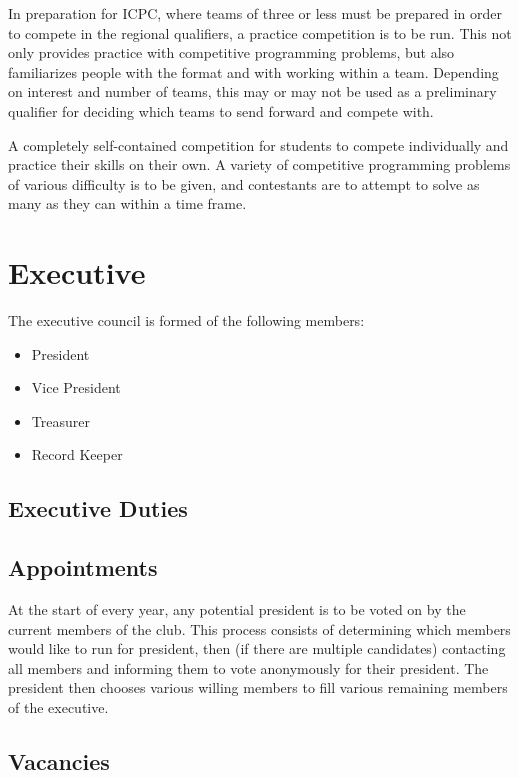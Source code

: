 \documentclass[11pt]{article}
\begin{document}
\vspace{2mm}
\noindent
In preparation for ICPC, where teams of three or less must be prepared in order to compete in the regional qualifiers, a practice competition is to be run. This not only provides practice with competitive programming problems, but also familiarizes people with the format and with working within a team. Depending on interest and number of teams, this may or may not be used as a preliminary qualifier for deciding which teams to send forward and compete with.

\vspace{2mm}
\noindent
A completely self-contained competition for students to compete individually and practice their skills on their own. A variety of competitive programming problems of various difficulty is to be given, and contestants are to attempt to solve as many as they can within a time frame.

\section{Executive}

The executive council is formed of the following members:

\begin{itemize}
  \item President
  \item Vice President
  \item Treasurer
  \item Record Keeper
\end{itemize}

\subsection{Executive Duties}

\subsection{Appointments}

At the start of every year, any potential president is to be voted on by the current members of the club. This process consists of determining which members would like to run for president, then (if there are multiple candidates) contacting all members and informing them to vote anonymously for their president. The president then chooses various willing members to fill various remaining members of the executive.

\subsection{Vacancies}
\end{document}
